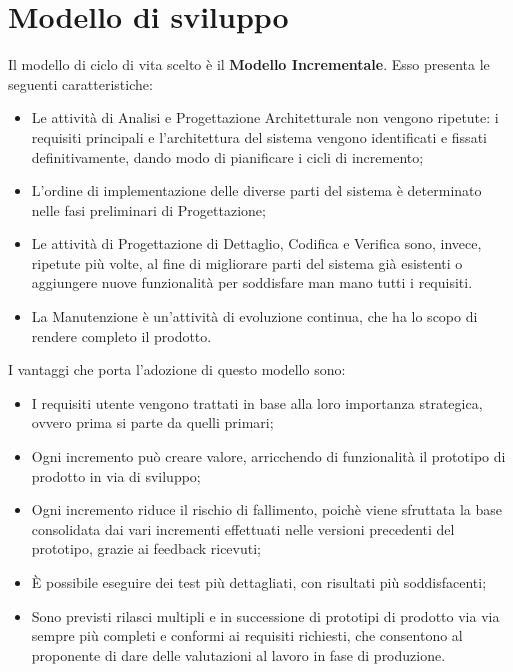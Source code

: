 \newpage
\section{Modello di sviluppo}
Il modello di ciclo di vita scelto è il \textbf{Modello Incrementale}. Esso presenta le seguenti caratteristiche:
\begin{itemize}
	\item Le attività di Analisi e Progettazione Architetturale non vengono ripetute: i requisiti principali e l'architettura del sistema vengono identificati e fissati definitivamente, dando modo di pianificare i cicli di incremento;
	\item L'ordine di implementazione delle diverse parti del sistema è determinato nelle fasi preliminari di Progettazione;
	\item Le attività di Progettazione di Dettaglio, Codifica e Verifica sono, invece, ripetute più volte, al fine di migliorare parti del sistema già esistenti o aggiungere nuove funzionalità per soddisfare man mano tutti i requisiti.
	\item La Manutenzione è un'attività di evoluzione continua, che ha lo scopo di rendere completo il prodotto.
\end{itemize}
I vantaggi che porta l'adozione di questo modello sono:
\begin{itemize}
	\item I requisiti utente vengono trattati in base alla loro importanza strategica, ovvero prima si parte da quelli primari;
	\item Ogni incremento può creare valore, arricchendo di funzionalità il prototipo di prodotto in via di sviluppo;
	\item Ogni incremento riduce il rischio di fallimento, poichè viene sfruttata la base consolidata dai vari incrementi effettuati nelle versioni precedenti del prototipo, grazie ai feedback ricevuti; 
	\item \MakeUppercase{è} possibile eseguire dei test più dettagliati, con risultati più soddisfacenti;
	\item Sono previsti rilasci multipli e in successione di prototipi di prodotto via via sempre più completi e conformi ai requisiti richiesti, che consentono al proponente di dare delle valutazioni al lavoro in fase di produzione.
\end{itemize}